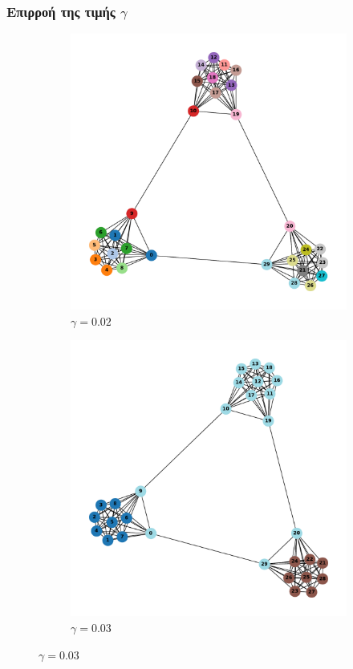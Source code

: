 \documentclass[12pt, letterpaper]{article}
\begin{document}
\subsubsection{Επιρροή της τιμής $\gamma$}  \label{gamma}


\begin{figure}
  \begin{subfigure}{0.5\textwidth}
    \centering
    \includegraphics[width=0.6\linewidth]{gammachange3,10gamma=0.02.pdf}
    \caption{$\gamma = 0.02$}
    \label{g1}
  \end{subfigure}
  \begin{subfigure}{0.5\textwidth}
    \centering
    \includegraphics[width=0.6\linewidth]{gammachange3,10gamma=0.003.pdf}
    \caption{$\gamma = 0.03$}
    \label{g2}
  \end{subfigure}

  \vfill


\end{figure}
\end{document}
